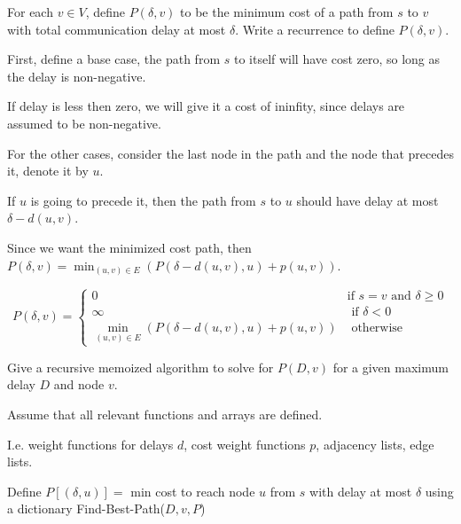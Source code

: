 \begin{questions}
	\question[5] For each $v \in V$, define
	$P(\delta,v)$ to be  the minimum cost of a path from $s$ to $v$ with total communication delay at most $\delta$. Write a recurrence to define $P(\delta, v)$.

	\ifsolutions\fi

	\begin{soln}
		First, define a base case, the path from \(s\) to itself will have cost zero, so long as the delay is non-negative.

		If delay is less then zero, we will give it a cost of ininfity, since delays are assumed to be non-negative.

		For the other cases, consider the last node in the path and the node that precedes it, denote it by \(u\).

		If \(u\) is going to precede it, then the path from \(s\) to \(u\) should have delay at most \(\delta - d(u, v)\).

		Since we want the minimized cost path, then \(P(\delta, v) = \min_{(u, v) \in E} (P(\delta - d(u, v), u) + p(u, v))\).

		\[
			P(\delta, v) = \begin{cases}
				0                                                      & \text{if } s = v \text{ and } \delta \geq 0 \\
				\infty                                                 & \text{ if } \delta < 0                      \\
				\min_{(u, v) \in E} (P(\delta - d(u, v), u) + p(u, v)) & \text{ otherwise }
			\end{cases}
		\]

	\end{soln}

	\question[7] Give a recursive memoized algorithm to solve for $P(D,v)$ for a given maximum delay $D$ and node $v$.

	\ifsolutions\fi

	\begin{soln}
		Assume that all relevant functions and arrays are defined.

		I.e. weight functions for delays \(d\), cost weight functions \(p\), adjacency lists, edge lists.

		\begin{algorithmic}[1]
			\State Define $P[(\delta, u)] = $ min cost to reach node $u$ from $s$ with delay at most $\delta$ using a dictionary
			\State \Return Find-Best-Path($D, v, P$)
			\EndProcedure
		\end{algorithmic}


\end{soln}
\end{questions}
